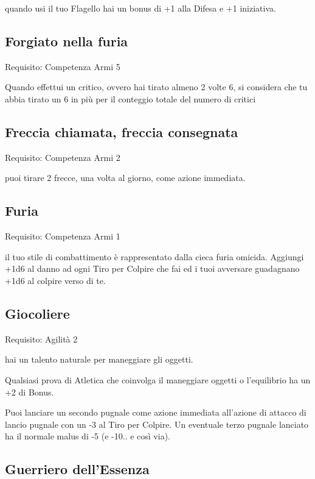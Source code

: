 \documentclass[a4paper,11pt,twoside,openany]{book}
\begin{document}
quando usi il tuo Flagello hai un bonus di +1 alla Difesa e +1 iniziativa.

\subsection{Forgiato nella furia}

Requisito: Competenza Armi 5

Quando effettui un critico, ovvero hai tirato almeno 2 volte 6, si considera che tu abbia tirato un 6 in più per il conteggio totale del numero di critici

\subsection{Freccia chiamata, freccia consegnata}

Requisito: Competenza Armi 2

puoi tirare 2 frecce, una volta al giorno, come azione immediata.

\subsection{Furia}

Requisito: Competenza Armi 1

il tuo stile di combattimento è rappresentato dalla cieca furia omicida. Aggiungi +1d6 al danno ad ogni Tiro per Colpire che fai ed i tuoi avversare guadagnano +1d6 al colpire verso di te.

\subsection{Giocoliere}

Requisito: Agilità 2

hai un talento naturale per maneggiare gli oggetti.

Qualsiasi prova di Atletica che coinvolga il maneggiare oggetti o l'equilibrio ha un +2 di Bonus.

Puoi lanciare un secondo pugnale come azione immediata all'azione di attacco di lancio pugnale con un -3 al Tiro per Colpire. Un eventuale terzo pugnale lanciato ha il normale malus di -5 (e -10.. e così via).

\subsection{Guerriero dell'Essenza}
\end{document}
